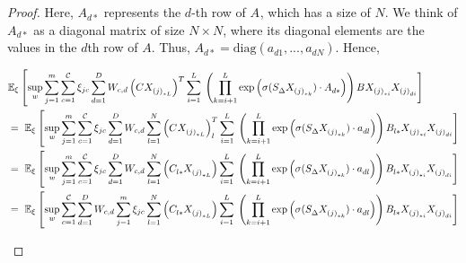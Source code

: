 \begin{proof}
Here, {$A^{}_{d*}$ represents the $d$-th row of $A^{}$}, which has a size of $N$. We think of $A^{}_{d*}$ as a diagonal matrix of size $N\times N$, where its diagonal elements are the values in the $d$th row of $A$. Thus, $A^{}_{d*} = \text{diag}(a^{}_{d1},...,a^{}_{dN})$. Hence,
\begin{small}
\begin{equation*}
\begin{aligned}
& \mathbb{E}_{\xi}\left[\sup_{w} \sum_{j=1}^m \sum_{c=1}^{\mathcal{C}} \xi_{jc} \sum_{d=1}^D W_{c,d} 
\left(C^{} X^{}_{{(j)}_{*L}}\right)^T \sum_{i=1}^L \right. 
 \left. \left(\prod_{k=i+1}^L \exp\left(\sigma(S^{}_{\Delta} X^{}_{{(j)}_{*k}}) \cdot 
A^{}_{d*}\right) \right) B^{} X^{}_{{(j)}_{*i}} X^{}_{{(j)}_{di}} \right] \\
&=~ \mathbb{E}_{\xi}\left[\sup_{w} \sum_{j=1}^m \sum_{c=1}^{\mathcal{C}} \xi_{jc} \sum_{d=1}^D W_{c,d} 
\sum_{l=1}^N \left(C^{} X^{}_{{(j)}_{*L}}\right)_l^T \sum_{i=1}^L \right. \left. \left(\prod_{k=i+1}^L \exp\left(\sigma(S^{}_{\Delta} X^{}_{{(j)}_{*k}}) \cdot 
a^{}_{dl}\right) \right) B_{l*}^{} X^{}_{{(j)}_{*i}} X^{}_{{(j)}_{di}} \right] \\
&=~ \mathbb{E}_{\xi}\left[\sup_{w} \sum_{j=1}^m \sum_{c=1}^{\mathcal{C}} \xi_{jc} \sum_{d=1}^D W_{c,d} 
\sum_{l=1}^N \left(C_{l*}^{} X^{}_{{(j)}_{*L}}\right) \sum_{i=1}^L \right. \left. \left(\prod_{k=i+1}^L \exp\left(\sigma(S^{}_{\Delta} X^{}_{{(j)}_{*k}}) \cdot 
a^{}_{dl}\right) \right) B_{l*}^{} X^{}_{{(j)}_{*i}} X^{}_{{(j)}_{di}} \right] \\
&=~ \mathbb{E}_{\xi}\left[\sup_{w} \sum_{c=1}^{\mathcal{C}} \sum_{d=1}^D W_{c,d} \sum_{j=1}^m \xi_{jc} 
\sum_{l=1}^N \left(C_{l*}^{} X^{}_{{(j)}_{*L}}\right) \sum_{i=1}^L \right.  \left. \left(\prod_{k=i+1}^L \exp\left(\sigma(S^{}_{\Delta} X^{}_{{(j)}_{*k}}) \cdot 
a^{}_{dl}\right) \right) B_{l*}^{} X^{}_{{(j)}_{*i}} X^{}_{{(j)}_{di}} \right]
\end{aligned}
\end{equation*}
\end{small}


\end{proof}
